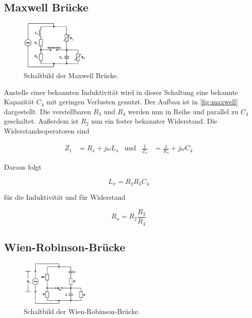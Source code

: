 \subsection{Maxwell Brücke}
\label{subsec:maxwell}

\begin{figure}[H]
    \centering
    \includegraphics[width=0.3\textwidth]{build/maxwell.PNG}
    \caption{Schaltbild der Maxwell Brücke.\cite[222]{V302}}
    \label{fig:maxwell}
\end{figure}

Anstelle einer bekannten Induktivität wird in dieser Schaltung eine bekannte Kapazität $C_4$ mit geringen Verlusten genutzt.
Der Aufbau ist in \autoref{fig:maxwell} dargestellt.
Die verstellbaren $R_3$ und $R_4$ werden nun in Reihe und parallel zu $C_4$ geschaltet.
Außerdem ist $R_2$ nun ein fester bekannter Widerstand.
Die Widerstandsoperatoren sind

\begin{align}
    Z_1 &= R_x + j\omega L_x & \text{und} & \frac{1}{Z_4}&=\frac{1}{R_4}+j\omega C_4
    \label{eqn:widerop_max}
\end{align}

Daraus folgt

\begin{equation}
    L_x = R_2 R_3 C_4
    \label{eqn:induktivität_max}
\end{equation}

für die Induktivität und für Widerstand

\begin{equation}
    R_x = R_2 \frac{R_3}{R_4}
    \label{eqn:widerstand_max}
\end{equation}

\subsection{Wien-Robinson-Brücke}
\label{subsec:wien-robinson}

\begin{figure}[H]
    \centering
    \includegraphics[width=0.3\textwidth]{build/wien-robinson.PNG}
    \caption{Schaltbild der Wien-Robinson-Brücke.\cite[222]{V302}}
    \label{fig:wien-robinson}
\end{figure}


